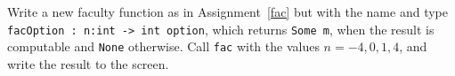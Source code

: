 Write a new faculty function as in Assignment~\ref{fac} but with the name and type \lstinline{facOption : n:int -> int option}, which returns \lstinline{Some m}, when the result is computable and \lstinline{None} otherwise. Call \lstinline{fac} with the values $n=-4,0,1,4$, and write the result to the screen.